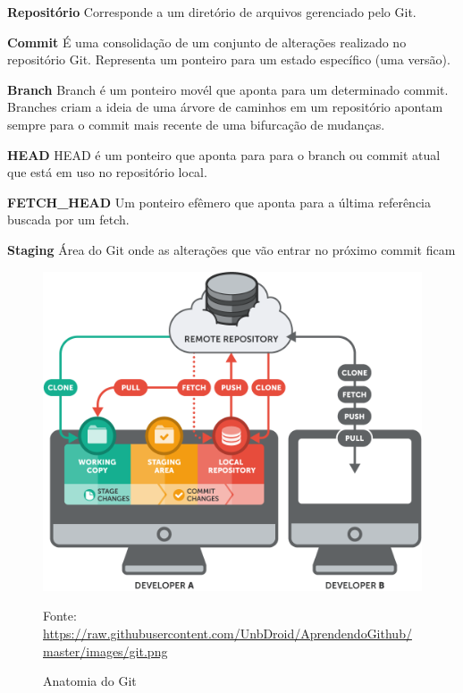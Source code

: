 \documentclass[twosideprint]{politex}
\newcommand{\legend}[1]{\begin{center}\def\caption{}\caption{#1}\end{center}}
\begin{document}
	\textbf{Repositório}
	\newline
	Corresponde a um diretório de arquivos gerenciado pelo Git.
	
	\textbf{Commit}
	\newline
	É uma consolidação de um conjunto de alterações realizado no repositório Git. Representa um ponteiro para um estado específico (uma versão).
	
	\textbf{Branch}
	\newline
	Branch é um ponteiro movél que aponta para um determinado commit. Branches criam a ideia de uma árvore de caminhos em um repositório apontam sempre para o commit mais recente de uma bifurcação de mudanças.
	
	\textbf{HEAD}
	\newline
	HEAD é um ponteiro que aponta para para o branch ou commit atual que está em uso no repositório local.
	
	\textbf{FETCH\_HEAD}
	\newline
	Um ponteiro efêmero que aponta para a última referência buscada por um fetch.
	
	\textbf{Staging}
	\newline
	Área do Git onde as alterações que vão entrar no próximo commit ficam
	
	\begin{figure}[htbp]
		\caption{\label{fig_git1}Anatomia do Git}
		\begin{center}
		\includegraphics[scale=0.4]{pictures/git.png}
		\end{center}
		\legend{Fonte: \url{https://raw.githubusercontent.com/UnbDroid/AprendendoGithub/master/images/git.png}}
	\end{figure}
	
\end{document}
